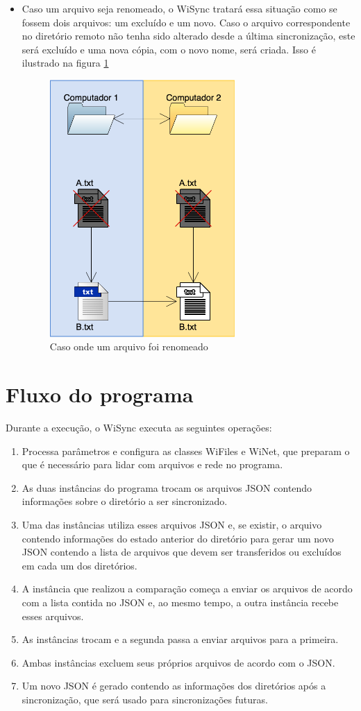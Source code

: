 \begin{itemize}
  \item Caso um arquivo seja renomeado, o WiSync tratará essa situação como se fossem dois arquivos: um excluído e um novo. Caso o arquivo correspondente no diretório remoto não tenha sido alterado desde a última sincronização, este será excluído e uma nova cópia, com o novo nome, será criada. Isso é ilustrado na figura \ref{d}
  \begin{figure}[h]
    \centering
    \includegraphics[width=200pt]{img/d.png}
    \caption{Caso onde um arquivo foi renomeado}
    \label{d}
  \end{figure}
\end{itemize}

\section{Fluxo do programa}
Durante a execução, o WiSync executa as seguintes operações:
\begin{enumerate}
  \item Processa parâmetros e configura as classes WiFiles e WiNet, que preparam o que é necessário para lidar com arquivos e rede no programa.
    \item As duas instâncias do programa trocam os arquivos JSON contendo informações sobre o diretório a ser sincronizado.
    \item Uma das instâncias utiliza esses arquivos JSON e, se existir, o arquivo contendo informações do estado anterior do diretório para gerar um novo JSON contendo a lista de arquivos que devem ser transferidos ou excluídos em cada um dos diretórios.
    \item A instância que realizou a comparação começa a enviar os arquivos de acordo com a lista contida no JSON e, ao mesmo tempo, a outra instância recebe esses arquivos.
    \item As instâncias trocam e a segunda passa a enviar arquivos para a primeira.
    \item Ambas instâncias excluem seus próprios arquivos de acordo com o JSON.
    \item Um novo JSON é gerado contendo as informações dos diretórios após a sincronização, que será usado para sincronizações futuras.
\end{enumerate}

